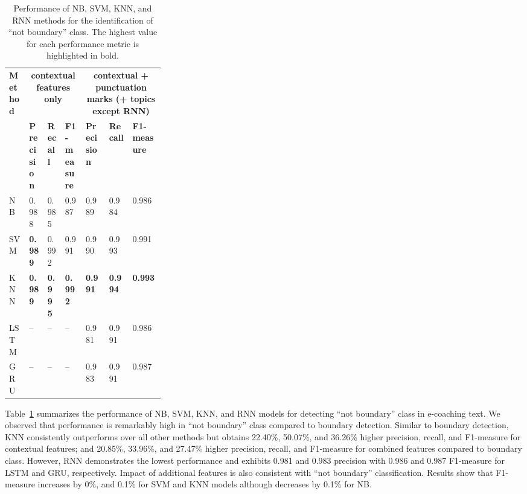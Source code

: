 \documentclass{amia}
\begin{document}
\begin{table}[ht]
\centering
\caption{Performance of NB, SVM, KNN, and RNN methods for the identification of ``not boundary'' class. The highest value for each performance metric is highlighted in bold.}
\label{tab:result_not_boundary}
  \begin{tabular}{|l|l|l|l|p{0.15\linewidth}|p{0.15\linewidth}|l|}
  \hline
   \multirow{2}{*}{\textbf{Method}} & \multicolumn{3}{|c|}{\textbf{contextual features only}} & \multicolumn{3}{|c|}{\textbf{contextual + punctuation marks (+ topics except RNN)}} \\\cline{2-7}
   & \textbf{Precision}  & \textbf{Recall} & \textbf{F1-measure} & \textbf{Precision}  & \textbf{Recall} & \textbf{F1-measure}\\ \hline    
    
 NB & 0.988 & 0.985 & 0.987 & 0.989 & 0.984 & 0.986 \\ \hline
 SVM & \textbf{0.989} & 0.992 & 0.991 & 0.990 & 0.993 & 0.991\\ \hline
 KNN & \textbf{0.989} & \textbf{0.995} & \textbf{0.992} & \textbf{0.991} & \textbf{0.994} & \textbf{0.993}\\ \hline
 LSTM & -- & -- & -- & 0.981 & 0.991 & 0.986 \\ \hline
 GRU & -- & -- & -- & 0.983 & 0.991 & 0.987 \\ \hline 
  \end{tabular}
\end{table}

Table~\ref{tab:result_not_boundary} summarizes the performance of NB, SVM, KNN, and RNN models for detecting ``not boundary'' class in e-coaching text. We observed that performance is remarkably high in ``not boundary'' class compared to boundary detection. Similar to boundary detection, KNN consistently outperforms over all other methods but obtains 22.40\%, 50.07\%, and 36.26\% higher precision, recall, and F1-measure for contextual features; and 20.85\%, 33.96\%, and 27.47\% higher precision, recall, and F1-measure for combined features compared to boundary class. However, RNN demonstrates the lowest performance and exhibits 0.981 and 0.983 precision with 0.986 and 0.987 F1-measure for LSTM and GRU, respectively. Impact of additional features is also consistent with ``not boundary'' classification. Results show that F1-measure increases by 0\%, and 0.1\% for SVM and KNN models although decreases by 0.1\% for NB. \\
\end{document}
